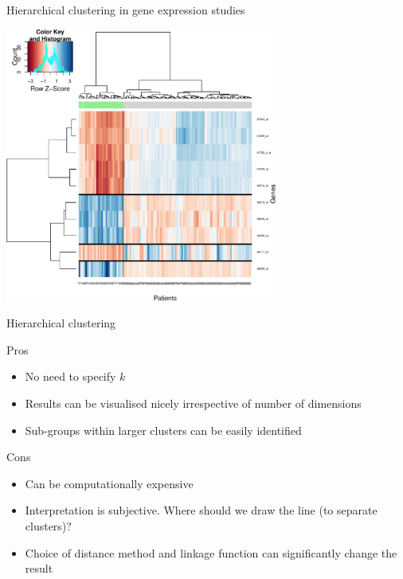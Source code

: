 \documentclass[pdf]{beamer}
\begin{document}
\begin{frame}{Hierarchical clustering in gene expression studies}
\begin{center}
	\includegraphics[width=0.67\textwidth]{geneExpression.pdf}
\end{center}
\end{frame}
\begin{frame}{Hierarchical clustering}
\begin{exampleblock}{Pros}
\begin{itemize}
	\item No need to specify $k$
	\item Results can be visualised nicely irrespective of number of dimensions 
	\item Sub-groups within larger clusters can be easily identified
\end{itemize}
\end{exampleblock}
\vfill
\begin{alertblock}{Cons}
\begin{itemize}
	\item Can be computationally expensive
	\item Interpretation is subjective. Where should we draw the line (to separate clusters)?
	\item Choice of distance method and linkage function can significantly change the result 
\end{itemize}
\end{alertblock}
\end{frame}
\end{document}
